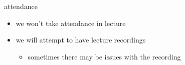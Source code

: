 \begin{frame}{attendance}
    \begin{itemize}
    \item we won't take attendance in lecture
    \item we will attempt to have lecture recordings
        \begin{itemize}
        \item sometimes there may be issues with the recording
        \end{itemize}
    \end{itemize}
\end{frame}

